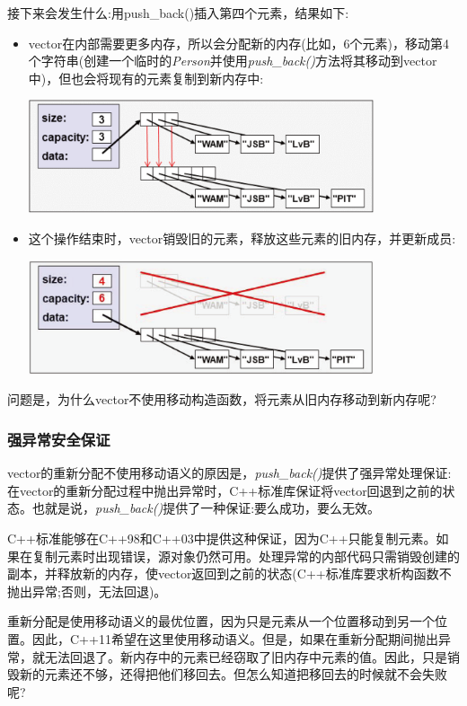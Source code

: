 接下来会发生什么:用push_back()插入第四个元素，结果如下:

\begin{itemize}
	\item vector在内部需要更多内存，所以会分配新的内存(比如，6个元素)，移动第4个字符串(创建一个临时的\textit{Person}并使用\textit{push_back()}方法将其移动到vector中)，但也会将现有的元素复制到新内存中:
\begin{center}
		\includegraphics[width=0.8\textwidth]{part1/ch7/images/2}
	\end{center}
	\item 这个操作结束时，vector销毁旧的元素，释放这些元素的旧内存，并更新成员:
\begin{center}
		\includegraphics[width=0.8\textwidth]{part1/ch7/images/3}
	\end{center}
\end{itemize}

问题是，为什么vector不使用移动构造函数，将元素从旧内存移动到新内存呢?

\subsubsection{强异常安全保证}

vector的重新分配不使用移动语义的原因是，\textit{push_back()}提供了强异常处理保证:在vector的重新分配过程中抛出异常时，C++标准库保证将vector回退到之前的状态。也就是说，\textit{push_back()}提供了一种保证:要么成功，要么无效。

C++标准能够在C++98和C++03中提供这种保证，因为C++只能复制元素。如果在复制元素时出现错误，源对象仍然可用。处理异常的内部代码只需销毁创建的副本，并释放新的内存，使vector返回到之前的状态(C++标准库要求析构函数不抛出异常;否则，无法回退)。

重新分配是使用移动语义的最优位置，因为只是元素从一个位置移动到另一个位置。因此，C++11希望在这里使用移动语义。但是，如果在重新分配期间抛出异常，就无法回退了。新内存中的元素已经窃取了旧内存中元素的值。因此，只是销毁新的元素还不够，还得把他们移回去。但怎么知道把移回去的时候就不会失败呢?

